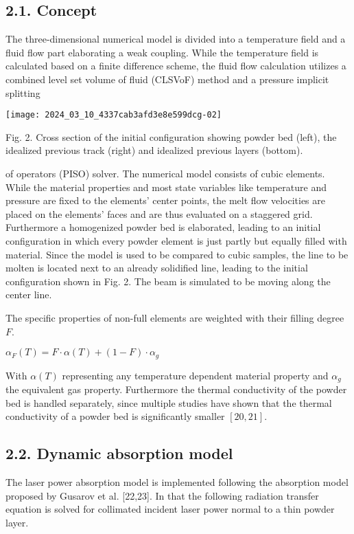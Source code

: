 \documentclass[10pt]{article}
\begin{document}
\subsection*{2.1. Concept}
The three-dimensional numerical model is divided into a temperature field and a fluid flow part elaborating a weak coupling. While the temperature field is calculated based on a finite difference scheme, the fluid flow calculation utilizes a combined level set volume of fluid (CLSVoF) method and a pressure implicit splitting

\begin{center}
\texttt{[image: 2024\_03\_10\_4337cab3afd3e8e599dcg-02]}
\end{center}

Fig. 2. Cross section of the initial configuration showing powder bed (left), the idealized previous track (right) and idealized previous layers (bottom).

of operators (PISO) solver. The numerical model consists of cubic elements. While the material properties and most state variables like temperature and pressure are fixed to the elements' center points, the melt flow velocities are placed on the elements' faces and are thus evaluated on a staggered grid. Furthermore a homogenized powder bed is elaborated, leading to an initial configuration in which every powder element is just partly but equally filled with material. Since the model is used to be compared to cubic samples, the line to be molten is located next to an already solidified line, leading to the initial configuration shown in Fig. 2. The beam is simulated to be moving along the center line.

The specific properties of non-full elements are weighted with their filling degree $F$.

$\alpha_{F}(T)=F \cdot \alpha(T)+(1-F) \cdot \alpha_{g}$

With $\alpha(T)$ representing any temperature dependent material property and $\alpha_{g}$ the equivalent gas property. Furthermore the thermal conductivity of the powder bed is handled separately, since multiple studies have shown that the thermal conductivity of a powder bed is significantly smaller $[20,21]$.

\subsection*{2.2. Dynamic absorption model}
The laser power absorption model is implemented following the absorption model proposed by Gusarov et al. [22,23]. In that the following radiation transfer equation is solved for collimated incident laser power normal to a thin powder layer.
\end{document}
